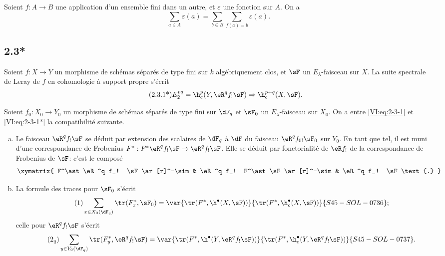 \subsection{}\label{VI:2-3}

Soient $f:A\to B$ une application d'un ensemble fini dans un autre, et 
$\varepsilon$ une fonction sur $A$. On a 
\begin{equation*}\tag{2.3.1}\label{VI:eq:2-3-1}
  \sum_{a\in A} \varepsilon(a) = \sum_{b\in B} \sum_{f(a)=b} \varepsilon(a) \text{.}
\end{equation*}





\subsection*{2.3*}\label{VI:2-3*}

Soient $f:X\to Y$ un morphisme de schémas séparés de type fini sur $k$ 
algébriquement clos, et $\sF$ un $E_\lambda$-faisceau sur $X$. La suite 
spectrale de Leray de $f$ en cohomologie à support propre s'écrit 
\begin{align*}\tag{2.3.1*}\label{VI:eq:2-3-1*}
  E_2^{p q} = \h_c^p(Y,\eR^q f_! \sF) \Rightarrow \h_c^{p+q}(X,\sF) \text{.}
\end{align*}

Soient $f_0:X_0 \to Y_0$ un morphisme de schémas séparés de type fini sur 
$\dF_q$ et $\sF_0$ un $E_\lambda$-faisceau sur $X_0$. On a entre 
\eqref{VI:eq:2-3-1} et \eqref{VI:eq:2-3-1*} la compatibilité suivante. 

\begin{enumerate}[a)]
  \item Le faisceau $\eR^q f_! \sF$ se déduit par extension des scalaires de 
    $\dF_q$ à $\dF$ du faisceau $\eR^q f_{0!} \sF_0$ sur $Y_0$. En tant que 
    tel, il est muni d'une correspondance de Frobenius 
    $F^\ast:F^\ast\eR^q f_! \sF \to \eR^q f_! \sF$. Elle se déduit par 
    fonctorialité de $\eR f_!$ de la correspondance de Frobenius de $\sF$: 
    c'est le composé 
    \[\xymatrix{
      F^\ast \eR^q f_! \sF \ar[r]^-\sim 
        & \eR^q f_! F^\ast \sF \ar[r]^-\sim 
        & \eR^q f_! \sF \text{.}
    }\]
  \item La formule des traces pour $\sF_0$ s'écrit 
    \begin{align*}\tag{1}\label{VI:eq:1}
      \sum_{x\in X_0(\dF_q)} \tr(F_x^\ast,\sF_0) = \var{\tr(F^\ast,\h^\bullet(X,\sF))}{\tr(F^\ast,\h_c^\bullet(X,\sF))}{S45-SOL-0736} \text{;}
    \end{align*}
    celle pour $\eR^q f_! \sF$ s'écrit 
    \begin{align*}\tag{2$_q$}\label{VI:eq:2_q} 
      \sum_{y\in Y_0(\dF_q)} \tr(F_y^\ast,\eR^q f_! \sF) = \var{\tr(F^\ast, \h^\bullet(Y,\eR^q f_! \sF))}{\tr(F^\ast,\h_c^\bullet(Y,\eR^q f_! \sF))}{S45-SOL-0737} \text{.}
    \end{align*}
\end{enumerate}

